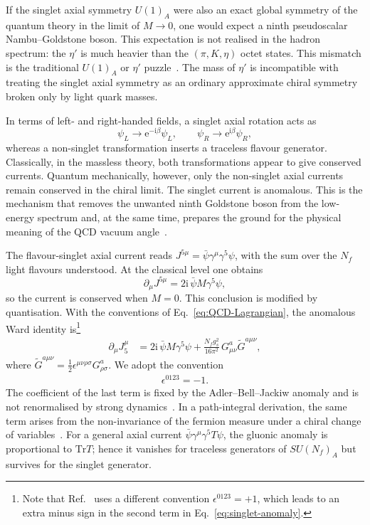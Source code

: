 \documentclass[review]{elsarticle}
\numberwithin{equation}{section}
\numberwithin{table}{section}
\numberwithin{figure}{section}
\def\tr{\mathrm{Tr}}
\begin{document}
If the singlet axial symmetry $U(1)_A$ were also an exact global symmetry of the quantum theory in the limit of $M\to 0$, one would expect a ninth pseudoscalar Nambu--Goldstone boson. This expectation is not realised in the hadron spectrum: the $\eta'$ is much heavier than the $(\pi,K,\eta)$ octet states. This mismatch is the traditional $U(1)_A$ or $\eta'$ puzzle~\cite{Weinberg:1975ui}. The mass of $\eta'$ is incompatible with treating the singlet axial symmetry as an ordinary approximate chiral symmetry broken only by light quark masses.

In terms of left- and right-handed fields, a singlet axial rotation acts as
\begin{equation}
    \psi_L \rightarrow \mathrm{e}^{-\mathrm{i}\beta}\psi_L,
    \qquad
    \psi_R \rightarrow \mathrm{e}^{\mathrm{i}\beta}\psi_R,
\end{equation}
whereas a non-singlet transformation inserts a traceless flavour generator. Classically, in the massless theory, both transformations appear to give conserved currents. Quantum mechanically, however, only the non-singlet axial currents remain conserved in the chiral limit. The singlet current is anomalous. This is the mechanism that removes the unwanted ninth Goldstone boson from the low-energy spectrum and, at the same time, prepares the ground for the physical meaning of the QCD vacuum angle~\cite{tHooft:1976rip,tHooft:1986ooh,Witten:1979vv,Veneziano:1979ec}.



The flavour-singlet axial current reads $J^{5\mu}=\bar{\psi}\gamma^\mu\gamma^5\psi$, with the sum over the $N_f$ light flavours understood. At the classical level one obtains
\begin{equation}
    \partial_\mu J^{5\mu} = 2\mathrm{i}\,\bar{\psi}M\gamma^5\psi,
\end{equation}
so the current is conserved when $M=0$. This conclusion is modified by quantisation. With the conventions of Eq.~\eqref{eq:QCD-Lagrangian}, the anomalous Ward identity is\footnote{Note that Ref.~\cite{Peskin:1995ev} uses a different convention $\epsilon^{0123}=+1$, which leads to an extra minus sign in the second term in Eq.~\eqref{eq:singlet-anomaly}.}
\begin{align}
    \partial_\mu J_5^\mu
    &= 2\mathrm{i}\,\bar{\psi}M\gamma^5\psi
    +\frac{N_f g_s^2}{16\pi^2}\,
    G^a_{\mu\nu}\widetilde{G}^{a\mu\nu},
    \label{eq:singlet-anomaly}
\end{align}
where $\widetilde{G}^{a\mu\nu} = \frac{1}{2}\epsilon^{\mu\nu\rho\sigma}G^a_{\rho\sigma}$. We adopt the convention 
\begin{align}
    \epsilon^{0123} = -1.
\end{align} The coefficient of the last term is fixed by the Adler--Bell--Jackiw anomaly and is not renormalised by strong dynamics~\cite{Adler:1969gk,Bell:1969ts}. In a path-integral derivation, the same term arises from the non-invariance of the fermion measure under a chiral change of variables~\cite{Fujikawa:1979ay,Fujikawa:1980eg}. For a general axial current $\bar{\psi}\gamma^\mu\gamma^5 T\psi$, the gluonic anomaly is proportional to $\tr T$; hence it vanishes for traceless generators of $SU(N_f)_A$ but survives for the singlet generator.
\end{document}
